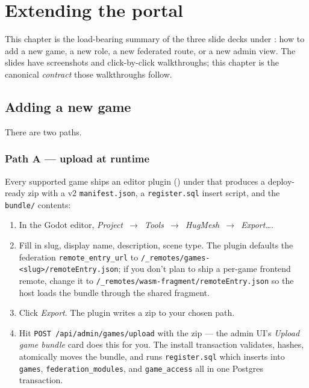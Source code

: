 \chapter{Extending the portal}

This chapter is the load-bearing summary of the three slide decks under
: how to add a new game, a new role, a
new federated route, or a new admin view. The slides have screenshots
and click-by-click walkthroughs; this chapter is the canonical
\emph{contract} those walkthroughs follow.

\section{Adding a new game}

There are two paths.

\subsection{Path A — upload at runtime}

Every supported game ships an editor plugin
() under
 that produces a deploy-ready
zip with a v2 \texttt{manifest.json}, a \texttt{register.sql} insert
script, and the \texttt{bundle/} contents:

\begin{enumerate}
  \item In the Godot editor, \emph{Project~$\rightarrow$~Tools~$\rightarrow$~HugMesh~$\rightarrow$~Export\dots}.
  \item Fill in slug, display name, description, scene type. The plugin
        defaults the federation \texttt{remote\_entry\_url} to
        \texttt{/\_remotes/games-<slug>/remoteEntry.json}; if you don't
        plan to ship a per-game frontend remote, change it to
        \texttt{/\_remotes/wasm-fragment/remoteEntry.json} so the host
        loads the bundle through the shared fragment.
  \item Click \emph{Export}. The plugin writes a zip to your chosen
        path.
  \item Hit \texttt{POST /api/admin/games/upload} with the zip — the
        admin UI's \emph{Upload game bundle} card does this for you.
        The install transaction validates, hashes, atomically moves the
        bundle, and runs \texttt{register.sql} which inserts into
        \texttt{games}, \texttt{federation\_modules}, and
        \texttt{game\_access} all in one Postgres transaction.
\end{enumerate}

